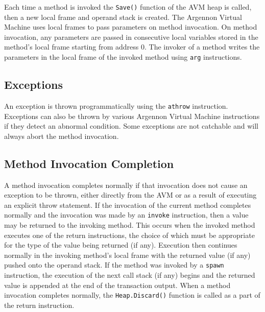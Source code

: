 
Each time a method is invoked the \texttt{Save()} function of the AVM heap is called, then a new local frame
and operand stack is created. The Argennon Virtual Machine uses local frames to pass parameters on
method invocation. On method invocation, any parameters are passed in consecutive local variables stored in the
method's local frame starting from address 0. The invoker of a method writes the parameters in the local frame
of the invoked method using \texttt{arg} instructions.


\subsection{Exceptions}\label{subsec:exceptions}

An exception is thrown programmatically using the \texttt{athrow} instruction. Exceptions can also be thrown by
various Argennon Virtual Machine instructions if they detect an abnormal condition. Some exceptions are not
catchable and will always abort the method invocation.


\subsection{Method Invocation Completion}\label{subsec:method-invocation-completion}

A method invocation completes normally if that invocation does not cause an exception to be thrown, either
directly from the AVM or as a result of executing an explicit throw statement. If the invocation of the current
method completes normally and the invocation was made by an \texttt{invoke} instruction, then a value may be
returned to the invoking method. This occurs when the invoked method executes one of the return instructions, the
choice of which must be appropriate for the type of the value being returned (if any). Execution then continues
normally in the invoking method's local frame with the returned
value (if any) pushed onto the operand stack. If the method was invoked by a \texttt{spawn} instruction,
the execution of the next call stack (if any) begins and the returned value
is appended at the end of the transaction output. When a method invocation completes normally,
the \texttt{Heap.Discard()} function is called as a part of the return instruction.

